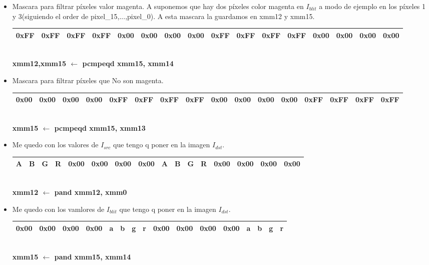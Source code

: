 \begin{itemize}
	\item Mascara para filtrar píxeles valor magenta. A suponemos que hay dos píxeles color magenta en $I_{blit}$ a modo de ejemplo en los píxeles 1 y 3(siguiendo el order de pixel_15,...,pixel_0). A esta mascara la guardamos en xmm12 y xmm15.
	
		\begin{center}
		   \begin{tabular}{| c | c | c | c || c | c | c | c || c | c | c | c || c | c | c | c |}
			 \hline
			 0xFF & 0xFF & 0xFF & 0xFF & 0x00 & 0x00 & 0x00 & 0x00 & 0xFF & 0xFF & 0xFF & 0xFF & 0x00 & 0x00 & 0x00 & 0x00 \\ \hline
		   \end{tabular}
		   \\ \textbf{xmm12,xmm15 $\gets$ pcmpeqd xmm15, xmm14}
		\end{center}

	\item Mascara para filtrar píxeles que No son magenta.

		\begin{center}
		   \begin{tabular}{| c | c | c | c || c | c | c | c || c | c | c | c || c | c | c | c |}
			 \hline
			 0x00 & 0x00 & 0x00 & 0x00 & 0xFF & 0xFF & 0xFF & 0xFF & 0x00 & 0x00 & 0x00 & 0x00 & 0xFF & 0xFF & 0xFF & 0xFF \\ \hline
		   \end{tabular}
		   \\ \textbf{xmm15 $\gets$ pcmpeqd xmm15, xmm13}
		\end{center}

	\item  Me quedo con los valores de $I_{src}$ que tengo q poner en la imagen $I_{dst}$.
		\begin{center}
		   \begin{tabular}{| c | c | c | c || c | c | c | c || c | c | c | c || c | c | c | c |}
			 \hline
			 A & B & G & R & 0x00 & 0x00 & 0x00 & 0x00 & A & B & G & R & 0x00 & 0x00 & 0x00 & 0x00 \\ \hline
		   \end{tabular}
		   \\ \textbf{xmm12 $\gets$ pand xmm12, xmm0}
		\end{center}		

	\item Me quedo con los vamlores de $I_{blit}$ que tengo q poner en la imagen $I_{dst}$.
		\begin{center}
		   \begin{tabular}{| c | c | c | c || c | c | c | c || c | c | c | c || c | c | c | c |}
			 \hline
			 0x00 & 0x00 & 0x00 & 0x00 & a & b & g & r & 0x00 & 0x00 & 0x00 & 0x00 & a & b & g & r \\ \hline
		   \end{tabular}
		   \\ \textbf{xmm15 $\gets$ pand xmm15, xmm14}
		\end{center}		
	

\end{itemize}
